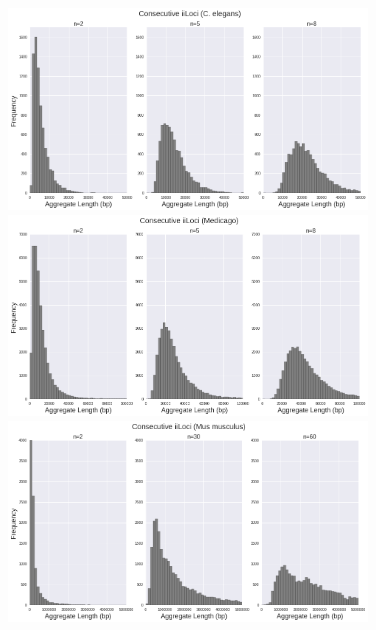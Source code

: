 
\begin{figure}[!bht]
\centering
\includegraphics[width=0.85\textwidth]{Assets/Graphics/iLoci/adj-iil-cele.png}
\includegraphics[width=0.85\textwidth]{Assets/Graphics/iLoci/adj-iil-mtru.png}
\includegraphics[width=0.85\textwidth]{Assets/Graphics/iLoci/adj-iil-mmus.png}
\caption{~}
\label{Fig:AdjiiLoci}
\end{figure}

